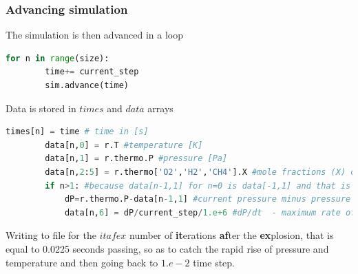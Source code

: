 \documentclass[a4paper]{article}
\begin{document}
\subsubsection{Advancing simulation}
The simulation is then advanced in a loop
\begin{lstlisting}[language=python]
    for n in range(size):
        time+= current_step
        sim.advance(time)
\end{lstlisting}
Data is stored in $times$ and $data$ arrays
\begin{lstlisting}[language=python]
        times[n] = time # time in [s]
        data[n,0] = r.T #temperature [K]
        data[n,1] = r.thermo.P #pressure [Pa]
        data[n,2:5] = r.thermo['O2','H2','CH4'].X #mole fractions (X) of O2, H and CH4 [%]
        if n>1: #because data[n-1,1] for n=0 is data[-1,1] and that is impossible
            dP=r.thermo.P-data[n-1,1] #current pressure minus pressure from previous iteration, in [Pa]
            data[n,6] = dP/current_step/1.e+6 #dP/dt  - maximum rate of pressure rise in [Mpa/s]
\end{lstlisting}
Writing to file for the $itafex$ number of \textbf{it}erations \textbf{af}ter the \textbf{ex}plosion, that is equal to 0.0225 seconds passing, so as to catch the rapid rise of pressure and temperature and then going back to $ 1.e-2$ time step.
\end{document}
